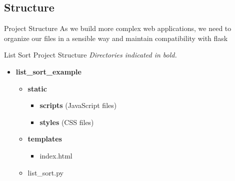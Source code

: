 \documentclass{beamer}
\begin{document}
\subsection{Structure}
	\begin{frame}[t]{Project Structure}
		As we build more complex web applications, we need to organize our
		files in a sensible way and maintain compatibility with flask \\

		\begin{block}{List Sort Project Structure}
			\footnotesize{\textit{Directories indicated in bold.}}
			\begin{itemize}
				\item{
					\textbf{list\_sort\_example}
					\begin{itemize}
						\item{
							\textbf{static}
							\begin{itemize}
								\item{
									\textbf{scripts} (JavaScript files)
								}
								\item{
									\textbf{styles} (CSS files)
								}
							\end{itemize}
						}
						\pause
						\item{
							\textbf{templates}
							\begin{itemize}
								\item{index.html}
							\end{itemize}
						}
						\pause
						\item{
							list\_sort.py
						}
					\end{itemize}
				}
			\end{itemize}
		\end{block}
	\end{frame}
\end{document}
